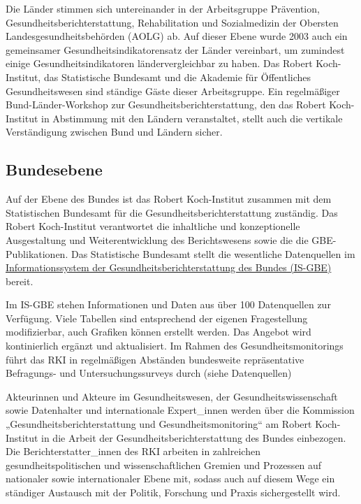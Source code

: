 \documentclass{article}
\begin{document}
Die Länder stimmen sich untereinander in der Arbeitsgruppe Prävention, Gesundheitsberichterstattung, Rehabilitation und Sozialmedizin der Obersten Landesgesundheitsbehörden (AOLG) ab.  Auf dieser Ebene wurde 2003 auch ein gemeinsamer Gesundheitsindikatorensatz der Länder vereinbart, um zumindest einige Gesundheitsindikatoren ländervergleichbar zu haben. Das Robert Koch-Institut, das Statistische Bundesamt und die Akademie für Öffentliches Gesundheitswesen sind ständige Gäste dieser Arbeitsgruppe. Ein regelmäßiger Bund-Länder-Workshop zur Gesundheitsberichterstattung, den das Robert Koch-Institut in Abstimmung mit den Ländern veranstaltet, stellt auch die vertikale Verständigung zwischen Bund und Ländern sicher.





\subsection{Bundesebene}\label{H5727488}



Auf der Ebene des Bundes ist das Robert Koch-Institut zusammen mit dem Statistischen Bundesamt für die Gesundheitsberichterstattung zuständig. Das Robert Koch-Institut verantwortet die inhaltliche und konzeptionelle Ausgestaltung und Weiterentwicklung des Berichtswesens sowie die die GBE-Publikationen. Das Statistische Bundesamt stellt die wesentliche Datenquellen im \href{https://www.gbe-bund.de}{Informationssystem der Gesundheitsberichterstattung des Bundes (IS-GBE)} bereit\autocite{ThomasZiese2000}.


Im IS-GBE stehen Informationen und Daten aus über 100 Datenquellen zur Verfügung. Viele Tabellen sind entsprechend der eigenen Fragestellung modifizierbar, auch Grafiken können erstellt werden. Das Angebot wird kontinierlich ergänzt und aktualisiert. Im Rahmen des Gesundheitsmonitorings führt das RKI in regelmäßigen Abständen bundesweite repräsentative Befragungs- und Untersuchungssurveys durch (siehe Datenquellen)


Akteurinnen und Akteure im Gesundheitswesen,  der Gesundheitswissenschaft sowie Datenhalter und internationale Expert\_innen werden über die Kommission „Gesundheitsberichterstattung und Gesundheitsmonitoring“ am Robert Koch-Institut in die Arbeit der Gesundheitsberichterstattung des Bundes einbezogen. Die Berichterstatter\_innen des RKI arbeiten in zahlreichen gesundheitspolitischen und wissenschaftlichen Gremien und Prozessen auf nationaler sowie internationaler Ebene mit, sodass auch auf diesem Wege ein ständiger Austausch mit der Politik, Forschung und Praxis sichergestellt wird\autocite{LampertThomasundweitere2010}.


\printbibliography[title={Literaturverzeichnis}]
\end{document}
